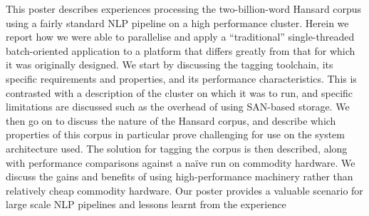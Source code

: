     This poster describes experiences processing the two-billion-word Hansard corpus using a fairly standard NLP pipeline on a high performance cluster.  Herein we report how we were able to parallelise and apply a ``traditional'' single-threaded batch-oriented application to a platform that differs greatly from that for which it was originally designed. We start by discussing the tagging toolchain, its specific requirements and properties, and its performance characteristics.  This is contrasted with a description of the cluster on which it was to run, and specific limitations are discussed such as the overhead of using SAN-based storage. We then go on to discuss the nature of the Hansard corpus, and describe which properties of this corpus in particular prove challenging for use on the system architecture used. The solution for tagging the corpus is then described, along with performance comparisons against a na\"{i}ve run on commodity hardware.  We discuss the gains and benefits of using high-performance machinery rather than relatively cheap commodity hardware. Our poster provides a valuable scenario for large scale NLP pipelines and lessons learnt from the experience


%
% 



